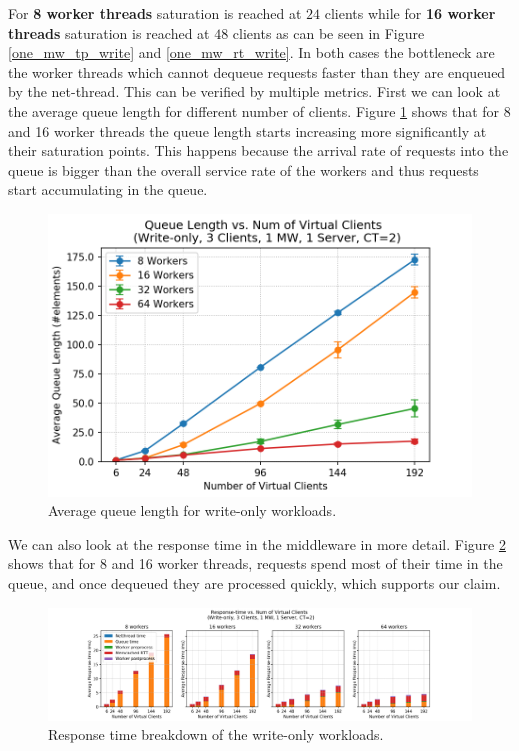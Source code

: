 For \textbf{8 worker threads} saturation is reached at $24$ clients while for \textbf{16 worker threads} saturation is reached at $48$ clients as can be seen in Figure \ref{one_mw_tp_write} and \ref{one_mw_rt_write}. In both cases the bottleneck are the worker threads which cannot dequeue requests faster than they are enqueued by the net-thread. This can be verified by multiple metrics. First we can look at the average queue length for different number of clients. Figure \ref{queue_length_one_mw_write} shows that for 8 and 16 worker threads the queue length starts increasing more significantly at their saturation points. This happens because the arrival rate of requests into the queue is bigger than the overall service rate of the workers and thus requests start accumulating in the queue.   
\begin{figure}[H]
    \centering
	\includegraphics[scale=0.48]{figures/2_BaselineWithMW/one_mw/one_mw_queuelength_write_2018-12-06_23h08.png}
	\caption{Average queue length for write-only workloads.}
	\label{queue_length_one_mw_write}
\end{figure}
We can also look at the response time in the middleware in more detail. Figure \ref{rt_breakdown_write_one_mw} shows that for 8 and 16 worker threads, requests spend most of their time in the queue, and once dequeued they are processed quickly, which supports our claim. 
\begin{figure}[H]
    \centering
	\includegraphics[scale=0.48,width=\linewidth]{figures/2_BaselineWithMW/one_mw/one_mw_rt_breakdown_write_2018-12-06_23h08.png}
	\caption{Response time breakdown of the write-only workloads.}
	\label{rt_breakdown_write_one_mw}
\end{figure}
